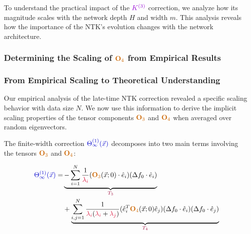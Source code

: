 \documentclass[a4paper]{article}
\theoremstyle{plain}
\theoremstyle{definition}
\theoremstyle{remark}
\begin{document}
To understand the practical impact of the $\textcolor{k3color}{K^{(3)}}$ correction, we analyze how its magnitude scales with the network depth $H$ and width $m$. This analysis reveals how the importance of the NTK's evolution changes with the network architecture.





\subsubsection{Determining the Scaling of $\textcolor{orange!80!black}{\mathbf{O}_4}$ from Empirical Results}



\subsubsection{From Empirical Scaling to Theoretical Understanding}

\begin{tcolorbox}[colback=blue!10,colframe=blue!60!black,title={\textbf{💭 MOTIVATION: Understanding the Scaling Law}},enhanced,drop shadow]
Our empirical analysis of the late-time \textcolor{kernelcolor}{NTK} correction revealed a specific scaling behavior with data size $N$. We now use this information to derive the implicit scaling properties of the tensor components $\textcolor{orange!80!black}{\mathbf{O}_3}$ and $\textcolor{orange!80!black}{\mathbf{O}_4}$ when averaged over random eigenvectors.
\end{tcolorbox}

\begin{tcolorbox}[colback=green!10,colframe=green!60!black,title={\textbf{📊 GENERAL REMARK: Correction Decomposition}},enhanced,drop shadow]
The finite-width correction $\textcolor{blue!80!black}{\Theta^{(1)}_\infty(\vec{x})}$ decomposes into two main terms involving the tensors $\textcolor{orange!80!black}{\mathbf{O}_3}$ and $\textcolor{orange!80!black}{\mathbf{O}_4}$:
\end{tcolorbox}

\begin{align}
\textcolor{blue!80!black}{\Theta^{(1)}_\infty(\vec{x})} = & \underbrace{-\sum_{i=1}^N \frac{1}{\textcolor{kernelcolor}{\lambda_{i}}}(\textcolor{orange!80!black}{\mathbf{O}_{3}}(\vec{x};0)\cdot\hat{e}_{i})(\Delta f_{0}\cdot\hat{e}_{i})}_{\textcolor{purple!80!black}{T_3}} \label{eq:T3_decomposition}\\
& + \underbrace{\sum_{i,j=1}^N\frac{1}{\textcolor{kernelcolor}{\lambda_{i}}(\textcolor{kernelcolor}{\lambda_{i}}+\textcolor{kernelcolor}{\lambda_{j}})}(\hat{e}_{i}^{T}\textcolor{orange!80!black}{\mathbf{O}_{4}}(\vec{x};0)\hat{e}_{j})(\Delta f_{0}\cdot \hat{e}_{i})(\Delta f_{0}\cdot \hat{e}_{j})}_{\textcolor{purple!80!black}{T_4}} \label{eq:T4_decomposition}
\end{align}
\end{document}
